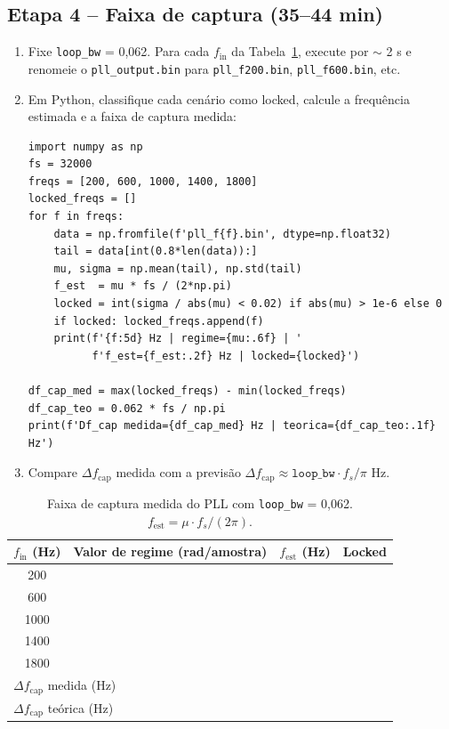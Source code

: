 \documentclass[11pt,a4paper]{article}
\begin{document}
\subsection*{Etapa 4 -- Faixa de captura (35--44 min)}

\begin{instrucao}
\begin{enumerate}[label=\arabic*.]
  \item Fixe \texttt{loop\_bw} = 0{,}062. Para cada $f_\text{in}$ da
    Tabela~\ref{tab:capture}, execute por $\sim$ 2 s e renomeie o
    \texttt{pll\_output.bin} para \texttt{pll\_f200.bin},
    \texttt{pll\_f600.bin}, etc.
  \item Em Python, classifique cada cenário como locked, calcule a frequência
    estimada e a faixa de captura medida:
\begin{verbatim}
import numpy as np
fs = 32000
freqs = [200, 600, 1000, 1400, 1800]
locked_freqs = []
for f in freqs:
    data = np.fromfile(f'pll_f{f}.bin', dtype=np.float32)
    tail = data[int(0.8*len(data)):]
    mu, sigma = np.mean(tail), np.std(tail)
    f_est  = mu * fs / (2*np.pi)
    locked = int(sigma / abs(mu) < 0.02) if abs(mu) > 1e-6 else 0
    if locked: locked_freqs.append(f)
    print(f'{f:5d} Hz | regime={mu:.6f} | '
          f'f_est={f_est:.2f} Hz | locked={locked}')

df_cap_med = max(locked_freqs) - min(locked_freqs)
df_cap_teo = 0.062 * fs / np.pi
print(f'Df_cap medida={df_cap_med} Hz | teorica={df_cap_teo:.1f} Hz')
\end{verbatim}
  \item Compare $\Delta f_\text{cap}$ medida com a previsão
    $\Delta f_\text{cap} \approx \texttt{loop\_bw}\cdot f_s/\pi$ Hz.
\end{enumerate}
\end{instrucao}

\begin{table}[H]
  \centering
  \begin{tabular}{c c c c}
    \toprule
    $f_\text{in}$ (Hz) & Valor de regime (rad/amostra) & $f_\text{est}$ (Hz) & Locked \\
    \midrule
    200  & & & \\
    600  & & & \\
    1000 & & & \\
    1400 & & & \\
    1800 & & & \\
    \midrule
    \multicolumn{3}{l}{$\Delta f_\text{cap}$ medida (Hz)} &  \\
    \multicolumn{3}{l}{$\Delta f_\text{cap}$ teórica (Hz)} &  \\
    \bottomrule
  \end{tabular}
  \caption{Faixa de captura medida do PLL com \texttt{loop\_bw} = 0{,}062. $f_\text{est} = \mu \cdot f_s/(2\pi)$.}
  \label{tab:capture}
\end{table}
\end{document}
